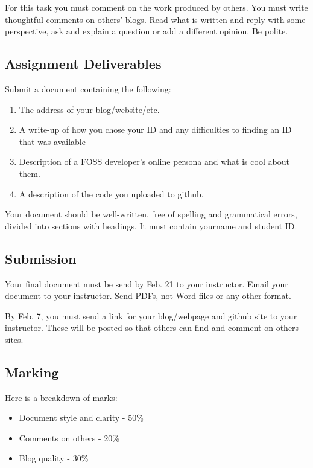 \documentclass[letterpaper]{article}
\begin{document}
For this task you must comment on the work produced by others.  You must write
thoughtful comments on others' blogs.  Read what is written and
reply with some perspective, ask and explain a question or add a different
opinion.  Be polite.



\subsection*{Assignment Deliverables}

Submit a document containing the following:

\begin{enumerate}
\item The address of your blog/website/etc.
\item A write-up of how you chose your ID and any difficulties to finding an
  ID that was available
\item Description of a FOSS developer's online persona and what is cool about
  them.
\item A description of the code you uploaded to github.
\end{enumerate}

Your document should be well-written, free of spelling and grammatical errors,
divided into sections with headings.  It must contain yourname and student ID.

\subsection*{Submission}

Your final document must be send by Feb. 21 to your instructor.  Email your
document to your instructor.  Send PDFs, not Word files or any
other format.

By Feb. 7, you must send a link for your blog/webpage and github site to your
instructor.  These will be posted so that others can find and comment on others
sites.

\subsection*{Marking}

Here is a breakdown of marks:

\begin{itemize}
\item Document style and clarity - 50\%
\item Comments on others - 20\%
\item Blog quality - 30\%
\end{itemize}


\end{document}
